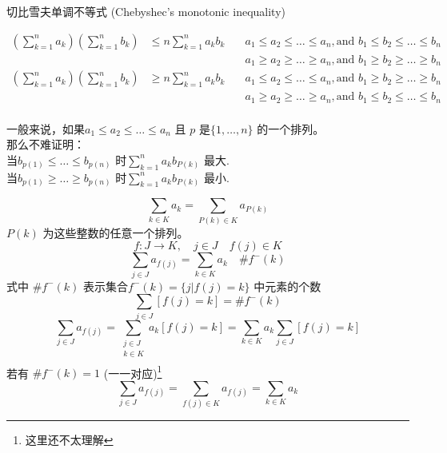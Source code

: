 \documentclass[mode=geye]{elegantnote}
\begin{document}
\begin{theorem}
    切比雪夫单调不等式 (Chebyshec's monotonic inequality)

\begin{equation*}
    \begin{array}{lll}
        \left(\sum_{k=1}^{n} a_k \right) \left(\sum_{k=1}^{n} b_k \right)   &\leqslant n \sum_{k=1}^{n} a_k b_k & \quad a_1\leqslant a_2\leqslant \dots\leqslant a_n, \text{and } b_1\leqslant b_2\leqslant \dots\leqslant b_n \\        
        & & \quad a_1\geqslant a_2\geqslant \dots\geqslant a_n, \text{and } b_1\geqslant b_2\geqslant \dots\geqslant b_n\\
        \left(\sum_{k=1}^{n} a_k \right) \left(\sum_{k=1}^{n} b_k \right)   &\geqslant n \sum_{k=1}^{n} a_k b_k & \quad a_1\leqslant a_2\leqslant \dots\leqslant a_n, \text{and } 
        b_1\geqslant b_2\geqslant \dots\geqslant b_n\\
        & & \quad a_1\geqslant a_2\geqslant \dots\geqslant a_n, \text{and }
        b_1\leqslant b_2\leqslant \dots\leqslant b_n \\        
    \end{array}
\end{equation*}
\end{theorem}
    一般来说，如果$ a_1 \leqslant a_2 \leqslant \dots \leqslant a_n $ 且 $ p $ 是$ \{1,\dots,n \} $ 的一个排列。\\
    那么不难证明：\\
    当$ b_{p(1)}\leqslant \dots \leqslant b_{p(n)} $ 时$ \sum_{k=1}^{n} a_k b_{P(k)} $ 最大.\\
    当$ b_{p(1)}\geqslant \dots \geqslant b_{p(n)} $ 时$ \sum_{k=1}^{n} a_k b_{P(k)} $ 最小.

    \begin{equation*}
        \sum_{k\in K} a_k = \sum_{P(k)\in K} a_{P(k)} 
    \end{equation*}
    $ P(k) $ 为这些整数的任意一个排列。
    \begin{equation*}
        f: J\rightarrow K, \quad j\in J \quad f(j) \in K
    \end{equation*}
    \begin{equation*}
        \sum_{j\in J}a_{f(j)} = \sum_{k\in K} a_k \quad \#f^-(k)
    \end{equation*}
    式中 $ \#f^-(k) $ 表示集合$ f^-(k) = \{j | f(j)=k\} $ 中元素的个数
    \begin{equation*}
        \sum_{j\in J}[f(j)=k] = \#f^-(k)
    \end{equation*}
    \begin{equation*}
        \sum_{j\in J}a_{f(j)} = \sum_{\begin{array}{l}j\in J\\ k\in K\\ \end{array}}a_k[f(j)=k] = \sum_{k\in K}a_k \sum_{j\in J} [f(j)=k]
    \end{equation*}
    若有 $ \#f^-(k) = 1 $ (一一对应)\footnote{这里还不太理解}
    \begin{equation*}
        \sum_{j\in J} a_{f(j)} = \sum_{f(j)\in K}a_{f(j)} = \sum_{k\in K} a_k
    \end{equation*}
\end{document}
